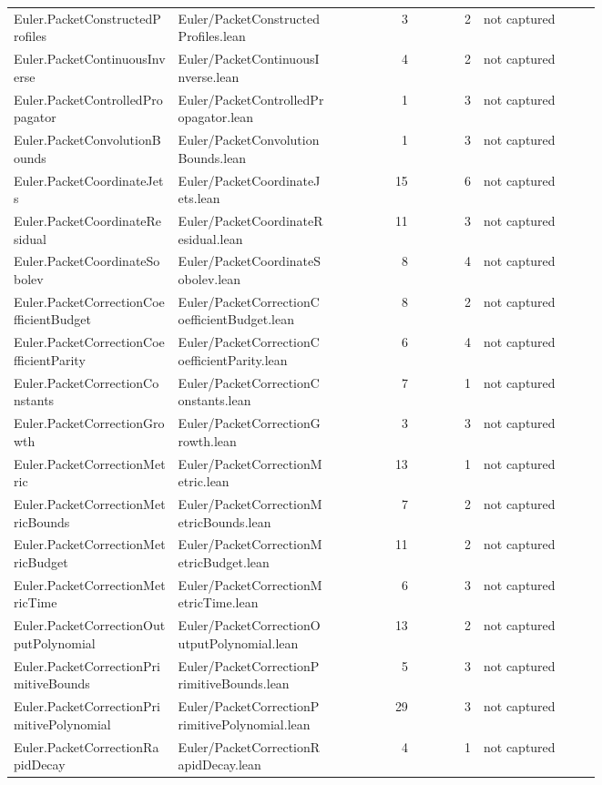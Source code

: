 \documentclass[10pt]{article}
\begin{document}
\begin{longtable}{p{0.28\linewidth}p{0.27\linewidth}r r p{0.20\linewidth}}
Euler.PacketConstructedProfiles & Euler/PacketConstructedProfiles.lean & 3 & 2 & not captured\\
Euler.PacketContinuousInverse & Euler/PacketContinuousInverse.lean & 4 & 2 & not captured\\
Euler.PacketControlledPropagator & Euler/PacketControlledPropagator.lean & 1 & 3 & not captured\\
Euler.PacketConvolutionBounds & Euler/PacketConvolutionBounds.lean & 1 & 3 & not captured\\
Euler.PacketCoordinateJets & Euler/PacketCoordinateJets.lean & 15 & 6 & not captured\\
Euler.PacketCoordinateResidual & Euler/PacketCoordinateResidual.lean & 11 & 3 & not captured\\
Euler.PacketCoordinateSobolev & Euler/PacketCoordinateSobolev.lean & 8 & 4 & not captured\\
Euler.PacketCorrectionCoefficientBudget & Euler/PacketCorrectionCoefficientBudget.lean & 8 & 2 & not captured\\
Euler.PacketCorrectionCoefficientParity & Euler/PacketCorrectionCoefficientParity.lean & 6 & 4 & not captured\\
Euler.PacketCorrectionConstants & Euler/PacketCorrectionConstants.lean & 7 & 1 & not captured\\
Euler.PacketCorrectionGrowth & Euler/PacketCorrectionGrowth.lean & 3 & 3 & not captured\\
Euler.PacketCorrectionMetric & Euler/PacketCorrectionMetric.lean & 13 & 1 & not captured\\
Euler.PacketCorrectionMetricBounds & Euler/PacketCorrectionMetricBounds.lean & 7 & 2 & not captured\\
Euler.PacketCorrectionMetricBudget & Euler/PacketCorrectionMetricBudget.lean & 11 & 2 & not captured\\
Euler.PacketCorrectionMetricTime & Euler/PacketCorrectionMetricTime.lean & 6 & 3 & not captured\\
Euler.PacketCorrectionOutputPolynomial & Euler/PacketCorrectionOutputPolynomial.lean & 13 & 2 & not captured\\
Euler.PacketCorrectionPrimitiveBounds & Euler/PacketCorrectionPrimitiveBounds.lean & 5 & 3 & not captured\\
Euler.PacketCorrectionPrimitivePolynomial & Euler/PacketCorrectionPrimitivePolynomial.lean & 29 & 3 & not captured\\
Euler.PacketCorrectionRapidDecay & Euler/PacketCorrectionRapidDecay.lean & 4 & 1 & not captured\\

\end{longtable}
\end{document}
